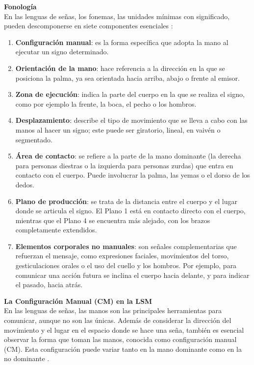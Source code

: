 \textbf{Fonología}\\
En las lenguas de señas, los fonemas, las unidades mínimas con significado, pueden descomponerse en siete componentes esenciales \cite{ref39}:

\begin{enumerate}
    \item \textbf{Configuración manual}: es la forma específica que adopta la mano al ejecutar un signo determinado.
    \item \textbf{Orientación de la mano}: hace referencia a la dirección en la que se posiciona la palma, ya sea orientada hacia arriba, abajo o frente al emisor.
    \item \textbf{Zona de ejecución}: indica la parte del cuerpo en la que se realiza el signo, como por ejemplo la frente, la boca, el pecho o los hombros.
    \item \textbf{Desplazamiento}: describe el tipo de movimiento que se lleva a cabo con las manos al hacer un signo; este puede ser giratorio, lineal, en vaivén o segmentado.
    \item \textbf{Área de contacto}: se refiere a la parte de la mano dominante (la derecha para personas diestras o la izquierda para personas zurdas) que entra en contacto con el cuerpo. Puede involucrar la palma, las yemas o el dorso de los dedos.
    \item \textbf{Plano de producción}: se trata de la distancia entre el cuerpo y el lugar donde se articula el signo. El Plano 1 está en contacto directo con el cuerpo, mientras que el Plano 4 se encuentra más alejado, con los brazos completamente extendidos.
    \item \textbf{Elementos corporales no manuales}: son señales complementarias que refuerzan el mensaje, como expresiones faciales, movimientos del torso, gesticulaciones orales o el uso del cuello y los hombros. Por ejemplo, para comunicar una acción futura se inclina el cuerpo hacia delante, y para indicar el pasado, hacia atrás.\\
\end{enumerate}

\textbf{La Configuración Manual (CM) en la LSM}\\
\label{sec:config_manual}
En las lenguas de señas, las manos son las principales herramientas para comunicar, aunque no son las únicas. Además de considerar la dirección del movimiento y el lugar en el espacio donde se hace una seña, también es esencial observar la forma que toman las manos, conocida como configuración manual (CM). Esta configuración puede variar tanto en la mano dominante como en la no dominante \cite{ref37}.\\

